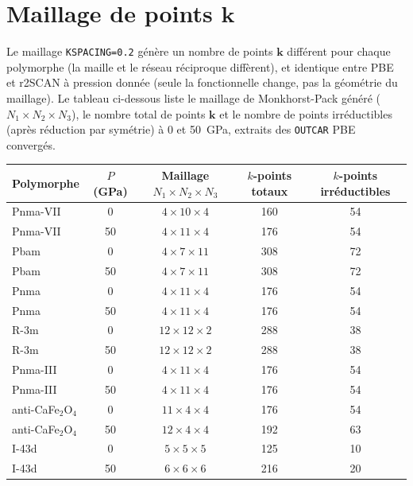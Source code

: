 \documentclass[11pt,a4paper]{article}
\begin{document}
\section{Maillage de points $\mathbf{k}$}

Le maillage \texttt{KSPACING=0.2} génère un nombre de points $\mathbf{k}$ différent pour chaque
polymorphe (la maille et le réseau réciproque diffèrent), et identique entre PBE et r2SCAN à
pression donnée (seule la fonctionnelle change, pas la géométrie du maillage). Le tableau
ci-dessous liste le maillage de Monkhorst-Pack généré ($N_1 \times N_2 \times N_3$), le nombre
total de points $\mathbf{k}$ et le nombre de points irréductibles (après réduction par symétrie)
à 0 et 50~GPa, extraits des \texttt{OUTCAR} PBE convergés.

\begin{center}
\begin{tabular}{lcccc}
\toprule
Polymorphe & $P$ (GPa) & Maillage $N_1{\times}N_2{\times}N_3$ & $k$-points totaux & $k$-points irréductibles \\
\midrule
Pnma-VII           & 0  & $4\times10\times4$ & 160 & 54 \\
Pnma-VII           & 50 & $4\times11\times4$ & 176 & 54 \\
\midrule
Pbam               & 0  & $4\times7\times11$ & 308 & 72 \\
Pbam               & 50 & $4\times7\times11$ & 308 & 72 \\
\midrule
Pnma               & 0  & $4\times11\times4$ & 176 & 54 \\
Pnma               & 50 & $4\times11\times4$ & 176 & 54 \\
\midrule
R-3m               & 0  & $12\times12\times2$ & 288 & 38 \\
R-3m               & 50 & $12\times12\times2$ & 288 & 38 \\
\midrule
Pnma-III           & 0  & $4\times11\times4$ & 176 & 54 \\
Pnma-III           & 50 & $4\times11\times4$ & 176 & 54 \\
\midrule
anti-CaFe$_2$O$_4$ & 0  & $11\times4\times4$ & 176 & 54 \\
anti-CaFe$_2$O$_4$ & 50 & $12\times4\times4$ & 192 & 63 \\
\midrule
I-43d              & 0  & $5\times5\times5$ & 125 & 10 \\
I-43d              & 50 & $6\times6\times6$ & 216 & 20 \\
\bottomrule
\end{tabular}
\end{center}
\end{document}
